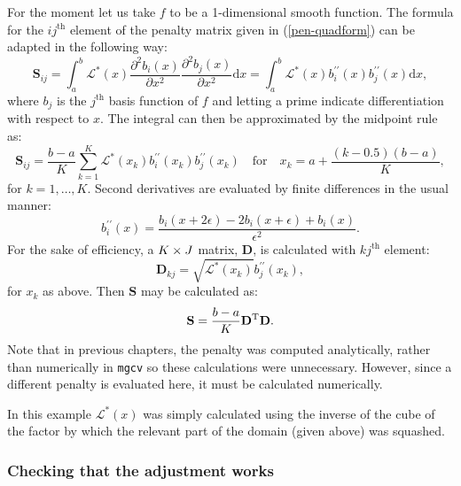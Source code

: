 For the moment let us take $f$ to be a 1-dimensional smooth function. The formula for the $ij^\text{th}$ element of the penalty matrix given in (\ref{pen-quadform}) can be adapted in the following way: 
\begin{equation*}
\mathbf{S}_{ij}= \int_a^b \mathcal{L}^*(x) \frac{\partial^2 b_i(x)}{\partial x^2}\frac{\partial^2 b_j(x)}{\partial x^2} \text{d}x = \int_a^b \mathcal{L}^*(x) b^{\prime\prime}_i(x) b^{\prime\prime}_j(x) \text{d}x,
\end{equation*}
where $b_j$ is the $j^\text{th}$ basis function of $f$ and letting a prime indicate differentiation with respect to $x$. The integral can then be approximated by the midpoint rule as:
\begin{equation}
\mathbf{S}_{ij}= \frac{b-a}{K}\sum_{k=1}^K \mathcal{L}^*(x_k) b^{\prime\prime}_i(x_k) b^{\prime\prime}_j(x_k) \quad \text{for} \quad x_k=a+\frac{(k-0.5)(b-a)}{K},
\label{midpointS}
\end{equation}
for $k=1,\dots, K$. Second derivatives are evaluated by finite differences in the usual manner:
\begin{equation}
\label{bfinitediff}
b^{\prime\prime}_i(x) = \frac{ b_i(x+2\epsilon) - 2b_i(x+\epsilon) + b_i(x)}{\epsilon^2}.
\end{equation}
For the sake of efficiency, a $K\times J$ matrix, $\mathbf{D}$, is calculated with $kj^\text{th}$ element:
\begin{equation}
\mathbf{D}_{kj}=\sqrt{\mathcal{L}^*(x_k)} b^{\prime\prime}_j(x_k),
\label{oneDD}
\end{equation}
for $x_k$ as above. Then $\mathbf{S}$ may be calculated as:
\begin{equation*}
\mathbf{S}=\frac{b-a}{K}\mathbf{D}^{\text{T}}\mathbf{D}.
\end{equation*}
Note that in previous chapters, the penalty was computed analytically, rather than numerically  in \texttt{mgcv} so these calculations were unnecessary. However, since a different penalty is evaluated here, it must be calculated numerically.\label{cor-r40}

In this example $\mathcal{L}^*(x)$ was simply calculated using the inverse of the cube of the factor by which the relevant part of the domain (given above) was squashed. 

\subsubsection{Checking that the adjustment works}


